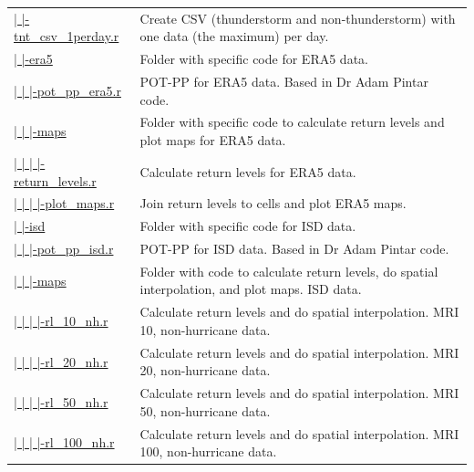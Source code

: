 \documentclass[12pt,twoside]{reedthesis}
\begin{document}
\begin{longtable}[t]{>{\raggedright\arraybackslash}p{1.3in}>{\raggedright\arraybackslash}p{4.9in}}
\href{ftp://ftp.geocorp.co/windthesis/code/pot_pp/write_t_nt_csv_one_data_per_day.r}{  |    |-tnt\_csv\_1perday.r} & Create CSV (thunderstorm and non-thunderstorm) with one data (the maximum) per day.\\
\href{ftp://ftp.geocorp.co/windthesis/code/pot_pp/era5/}{  |    |-era5} & Folder with specific code for ERA5 data.\\
\href{ftp://ftp.geocorp.co/windthesis/code/pot_pp/era5/pot_pp_era5.r}{  |    |    |-pot\_pp\_era5.r} & POT-PP for ERA5 data. Based in Dr Adam Pintar code.\\
\href{ftp://ftp.geocorp.co/windthesis/code/pot_pp/era5/maps/}{  |    |    |-maps} & Folder with specific code to calculate return levels and plot maps for ERA5 data.\\
\href{ftp://ftp.geocorp.co/windthesis/code/pot_pp/era5/maps/return_levels.r}{  |    |    |    |-return\_levels.r} & Calculate return levels for ERA5 data.\\
\href{ftp://ftp.geocorp.co/windthesis/code/pot_pp/era5/maps/plot_maps.r}{  |    |    |    |-plot\_maps.r} & Join return levels to cells and plot ERA5 maps.\\
\href{ftp://ftp.geocorp.co/windthesis/code/pot_pp/isd/}{  |    |-isd} & Folder with specific code for ISD data.\\
\href{ftp://ftp.geocorp.co/windthesis/code/pot_pp/isd/pot_pp_isd.r}{  |    |    |-pot\_pp\_isd.r} & POT-PP for ISD data. Based in Dr Adam Pintar code.\\
\href{ftp://ftp.geocorp.co/windthesis/code/pot_pp/isd/maps/}{  |    |    |-maps} & Folder with code to calculate return levels, do spatial interpolation, and plot maps. ISD data.\\
\href{ftp://ftp.geocorp.co/windthesis/code/pot_pp/isd/maps/return_levels_10_nh.r}{  |    |    |    |-rl\_10\_nh.r} & Calculate return levels and do spatial interpolation. MRI 10, non-hurricane data.\\
\href{ftp://ftp.geocorp.co/windthesis/code/pot_pp/isd/maps/return_levels_20_nh.r}{  |    |    |    |-rl\_20\_nh.r} & Calculate return levels and do spatial interpolation. MRI 20, non-hurricane data.\\
\href{ftp://ftp.geocorp.co/windthesis/code/pot_pp/isd/maps/return_levels_50_nh.r}{  |    |    |    |-rl\_50\_nh.r} & Calculate return levels and do spatial interpolation. MRI 50, non-hurricane data.\\
\href{ftp://ftp.geocorp.co/windthesis/code/pot_pp/isd/maps/return_levels_100_nh.r}{  |    |    |    |-rl\_100\_nh.r} & Calculate return levels and do spatial interpolation. MRI 100, non-hurricane data.\\

\end{longtable}
\end{document}
